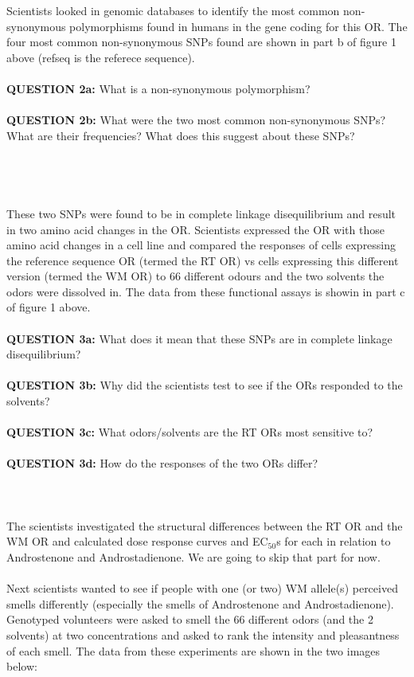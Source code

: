 \documentclass{article}
\begin{document}
\section{}
Scientists looked in genomic databases to identify the most common non-synonymous polymorphisms found in humans in the gene coding for this OR. The four most common non-synonymous SNPs found are shown in part b of figure 1 above (refseq is the referece sequence).\\\\
\textbf{QUESTION 2a:} What is a non-synonymous polymorphism?\\\\
\textbf{QUESTION 2b:} What were the two most common non-synonymous SNPs? What are their frequencies? What does this suggest about these SNPs?\\
\\
\\
\section{}
These two SNPs were found to be in complete linkage disequilibrium and result in two amino acid changes in the OR. Scientists expressed the OR with those amino acid changes in a cell line and compared the responses of cells expressing the reference sequence OR (termed the RT OR) vs cells expressing this different version (termed the WM OR) to 66 different odours and the two solvents the odors were dissolved in. The data from these functional assays is showin in part c of figure 1 above. \\\\
\textbf{QUESTION 3a:} What does it mean that these SNPs are in complete linkage disequilibrium?\\\\
\textbf{QUESTION 3b:} Why did the scientists test to see if the ORs responded to the solvents?\\\\
\textbf{QUESTION 3c:} What odors/solvents are the RT ORs most sensitive to?\\\\
\textbf{QUESTION 3d:} How do the responses of the two ORs differ?\\\\

\section{}
The scientists investigated the structural differences between the RT OR and the WM OR and calculated dose response curves and EC$_50$s for each in relation to Androstenone and Androstadienone. We are going to skip that part for now. \\
\\
Next scientists wanted to see if people with one (or two) WM allele(s) perceived smells differently (especially the smells of Androstenone and Androstadienone). Genotyped volunteers were asked to smell the 66 different odors (and the 2 solvents) at two concentrations and asked to rank the intensity and pleasantness of each smell. The data from these experiments are shown in the two images below:\break
\end{document}
